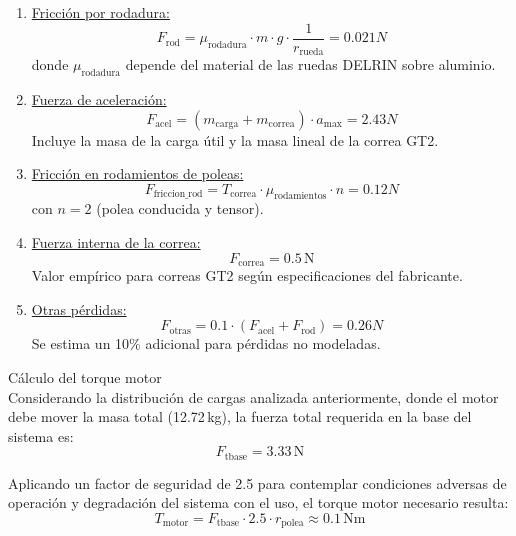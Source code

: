 \begin{enumerate}
    \item \underline{Fricción por rodadura:}
    \begin{equation}
    F_{\text{rod}} = \mu_{\text{rodadura}} \cdot m \cdot g \cdot \frac{1}{r_{\text{rueda}}}= 0.021N
    \end{equation}
    donde $\mu_{\text{rodadura}}$ depende del material de las ruedas DELRIN sobre aluminio.
    
    \item \underline{Fuerza de aceleración:}
    \begin{equation}
    F_{\text{acel}} = (m_{\text{carga}} + m_{\text{correa}}) \cdot a_{\text{max}} = 2.43 N
    \end{equation}
    Incluye la masa de la carga útil y la masa lineal de la correa GT2.
    
    \item \underline{Fricción en rodamientos de poleas:}
    \begin{equation}
    F_{\text{friccion\_rod}} = T_{\text{correa}} \cdot \mu_{\text{rodamientos}} \cdot n = 0.12N
    \end{equation}
    con $n = 2$ (polea conducida y tensor).
    
    \item \underline{Fuerza interna de la correa:}
    \begin{equation}
    F_{\text{correa}} = 0.5\,\text{N}
    \end{equation}
    Valor empírico para correas GT2 según especificaciones del fabricante.
    
    \item \underline{Otras pérdidas:}
    \begin{equation}
    F_{\text{otras}} = 0.1 \cdot (F_{\text{acel}} + F_{\text{rod}})=0.26N
    \end{equation}
    Se estima un 10\% adicional para pérdidas no modeladas.
\end{enumerate}

Cálculo del torque motor\\
Considerando la distribución de cargas analizada anteriormente, donde el motor debe mover la masa total (12.72\,kg), la fuerza total requerida en la base del sistema es:
\begin{equation}
F_{\text{tbase}} = 3.33\,\text{N}
\end{equation}


Aplicando un factor de seguridad de 2.5 para contemplar condiciones adversas de operación y degradación del sistema con el uso, el torque motor necesario resulta:
\begin{equation}
T_{\text{motor}} = F_{\text{tbase}} \cdot 2.5 \cdot r_{\text{polea}} \approx 0.1\,\text{Nm}
\label{eq:torque_motor}
\end{equation}


